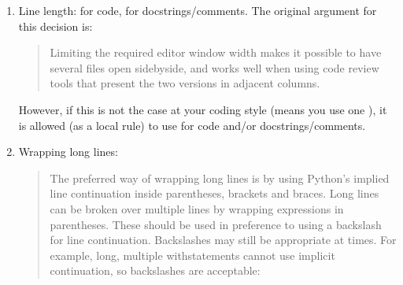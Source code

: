\documentclass[letterpaper,10pt,english]{sphinxmanual}
\begin{document}
\begin{enumerate}
\begin{sphinxVerbatim}[commandchars=\\\{\}]
  
      
      
\end{sphinxVerbatim}

\item {} 
Line length:  for code,  for docstrings/comments. The original argument for this decision is:
\begin{quote}

Limiting the required editor window width makes it possible to have several files open side\sphinxhyphen{}by\sphinxhyphen{}side, and works well when using code review tools that present the two versions in adjacent columns.
\end{quote}

However, if this is not the case at your coding style (means you use one ), it is allowed (as a local rule) to use  for code and/or docstrings/comments.

\item {} 
Wrapping long lines:
\begin{quote}

The preferred way of wrapping long lines is by using Python’s implied line continuation inside parentheses, brackets and braces. Long lines can be broken over multiple lines by wrapping expressions in parentheses. These should be used in preference to using a backslash for line continuation.
Backslashes may still be appropriate at times. For example, long, multiple with\sphinxhyphen{}statements cannot use implicit continuation, so backslashes are acceptable:
\end{quote}

\begin{sphinxVerbatim}[commandchars=\\\{\}]
    \PYGZbs{}
        
\end{sphinxVerbatim}


\end{enumerate}
\end{document}
